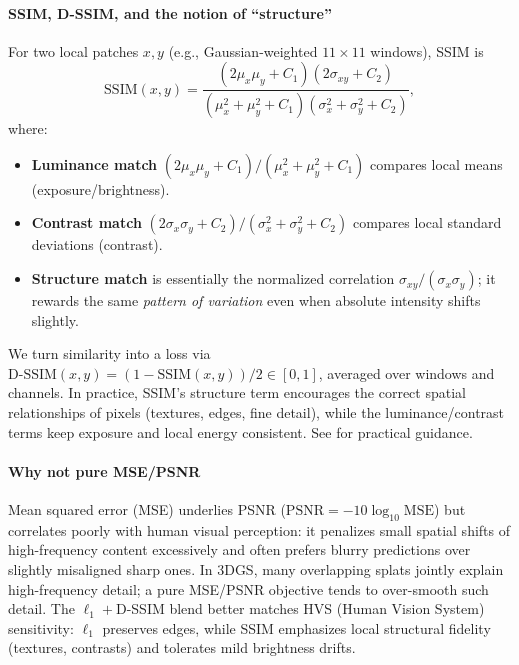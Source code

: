 \begin{enrichment}
\begin{enrichment}
\begin{enrichment}
        \paragraph{SSIM, D-SSIM, and the notion of “structure”}
        For two local patches $x,y$ (e.g., Gaussian-weighted $11{\times}11$ windows), SSIM is
        \[
        \mathrm{SSIM}(x,y)
        =\frac{(2\mu_x\mu_y + C_1)(2\sigma_{xy}+C_2)}
        {(\mu_x^2+\mu_y^2 + C_1)(\sigma_x^2+\sigma_y^2 + C_2)},
        \]
        where:
        \begin{itemize}
            \item \textbf{Luminance match} $(2\mu_x\mu_y + C_1)/(\mu_x^2+\mu_y^2 + C_1)$ compares local means (exposure/brightness).
            \item \textbf{Contrast match} $(2\sigma_x\sigma_y + C_2)/(\sigma_x^2+\sigma_y^2 + C_2)$ compares local standard deviations (contrast).
            \item \textbf{Structure match} is essentially the normalized correlation $\sigma_{xy}/(\sigma_x\sigma_y)$; it rewards the same \emph{pattern of variation} even when absolute intensity shifts slightly.
        \end{itemize}
        We turn similarity into a loss via $\mathrm{D\text{-}SSIM}(x,y)=(1-\mathrm{SSIM}(x,y))/2\in[0,1]$, averaged over windows and channels. In practice, SSIM’s structure term encourages the correct spatial relationships of pixels (textures, edges, fine detail), while the luminance/contrast terms keep exposure and local energy consistent. See \cite{nilsson2020_understanding_ssim,baker2022_ssim_floating_point} for practical guidance.
        
        \paragraph{Why not pure MSE/PSNR}
        Mean squared error (MSE) underlies PSNR ($\mathrm{PSNR}=-10\log_{10}\mathrm{MSE}$) but correlates poorly with human visual perception: it penalizes small spatial shifts of high-frequency content excessively and often prefers blurry predictions over slightly misaligned sharp ones. In 3DGS, many overlapping splats jointly explain high-frequency detail; a pure MSE/PSNR objective tends to over-smooth such detail. The $\ell_1{+}$D-SSIM blend better matches HVS (Human Vision System) sensitivity: $\ell_1$ preserves edges, while SSIM emphasizes local structural fidelity (textures, contrasts) and tolerates mild brightness drifts.
        

\end{enrichment}
\end{enrichment}
\end{enrichment}
